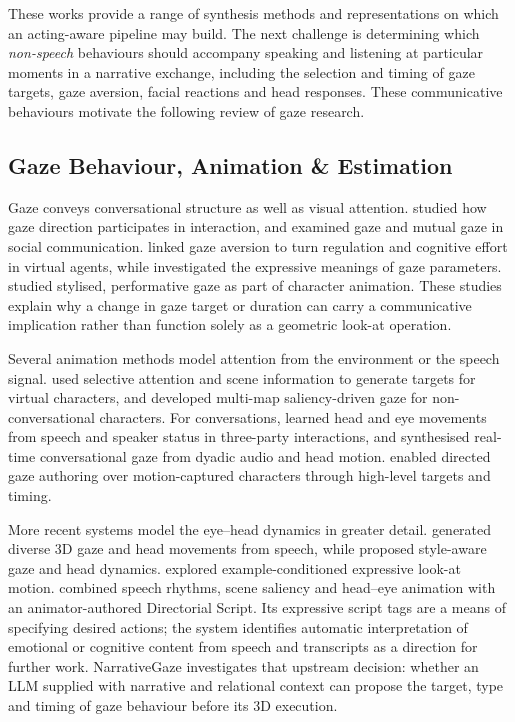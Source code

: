 \documentclass[11pt,a4paper]{article}
\begin{document}
These works provide a range of synthesis methods and representations on which an acting-aware pipeline may build. The next challenge is determining which \emph{non-speech} behaviours should accompany speaking and listening at particular moments in a narrative exchange, including the selection and timing of gaze targets, gaze aversion, facial reactions and head responses. These communicative behaviours motivate the following review of gaze research.

\subsection{Gaze Behaviour, Animation \& Estimation}

Gaze conveys conversational structure as well as visual attention. \citet{kendon1967functions} studied how gaze direction participates in interaction, and \citet{argyle1976gaze} examined gaze and mutual gaze in social communication. \citet{andrist2013aversion} linked gaze aversion to turn regulation and cognitive effort in virtual agents, while \citet{lance2010expressive} investigated the expressive meanings of gaze parameters. \citet{pejsa2013stylized} studied stylised, performative gaze as part of character animation. These studies explain why a change in gaze target or duration can carry a communicative implication rather than function solely as a geometric look-at operation.

Several animation methods model attention from the environment or the speech signal. \citet{kokkinara2011attention} used selective attention and scene information to generate targets for virtual characters, and \citet{goude2024saliency} developed multi-map saliency-driven gaze for non-conversational characters. For conversations, \citet{jin2019threeparty} learned head and eye movements from speech and speaker status in three-party interactions, and \citet{canales2023realtime} synthesised real-time conversational gaze from dyadic audio and head motion. \citet{pejsa2016authoring} enabled directed gaze authoring over motion-captured characters through high-level targets and timing.

More recent systems model the eye--head dynamics in greater detail. \citet{zhuang2026talkingeyes} generated diverse 3D gaze and head movements from speech, while \citet{shi2025beatgaze} proposed style-aware gaze and head dynamics. \citet{ferstl2023expressive} explored example-conditioned expressive look-at motion. \citet{pan2024s3} combined speech rhythms, scene saliency and head--eye animation with an animator-authored Directorial Script. Its expressive script tags are a means of specifying desired actions; the system identifies automatic interpretation of emotional or cognitive content from speech and transcripts as a direction for further work. NarrativeGaze investigates that upstream decision: whether an LLM supplied with narrative and relational context can propose the target, type and timing of gaze behaviour before its 3D execution.
\end{document}
